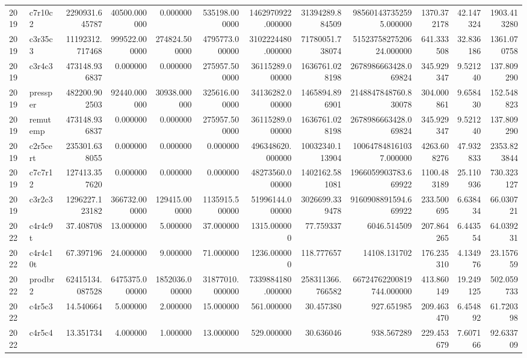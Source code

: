 \begin{tabular}{llrrrrrrrrrr}
2019 & c7r10c2 & 2290931.645787 & 40500.000000 & 0.000000 & 535198.000000 & 1462970922.000000 & 31394289.884509 & 985601437352595.000000 & 1370.372178 & 42.147324 & 1903.413280 \\
2019 & c3r35c3 & 11192312.717468 & 999522.000000 & 274824.500000 & 4795773.000000 & 3102224480.000000 & 71780051.738074 & 5152375827520624.000000 & 641.333508 & 32.836186 & 1361.070758 \\
2019 & c3r4c3 & 473148.936837 & 0.000000 & 0.000000 & 275957.500000 & 36115289.000000 & 1636761.028198 & 2678986663428.069824 & 345.929347 & 9.521240 & 137.809290 \\
2019 & pressper & 482200.902503 & 92440.000000 & 30938.000000 & 325616.000000 & 34136282.000000 & 1465894.896901 & 2148847848760.830078 & 304.000861 & 9.658430 & 152.548823 \\
2019 & remutemp & 473148.936837 & 0.000000 & 0.000000 & 275957.500000 & 36115289.000000 & 1636761.028198 & 2678986663428.069824 & 345.929347 & 9.521240 & 137.809290 \\
2019 & c2r5cert & 235301.638055 & 0.000000 & 0.000000 & 0.000000 & 496348620.000000 & 10032340.113904 & 100647848161037.000000 & 4263.608276 & 47.932833 & 2353.823844 \\
2019 & c7c7r12 & 127413.357620 & 0.000000 & 0.000000 & 0.000000 & 48273560.000000 & 1402162.581081 & 1966059903783.669922 & 1100.483189 & 25.110936 & 730.323127 \\
2019 & c3r2c3 & 1296227.123182 & 366732.000000 & 129415.000000 & 1135915.500000 & 51996144.000000 & 3026699.339478 & 9160908891594.669922 & 233.500695 & 6.638434 & 66.030721 \\
2022 & c4r4c9t & 37.408708 & 13.000000 & 5.000000 & 37.000000 & 1315.000000 & 77.759337 & 6046.514509 & 207.864265 & 6.443554 & 64.039231 \\
2022 & c4r4c10t & 67.397196 & 24.000000 & 9.000000 & 71.000000 & 1236.000000 & 118.777657 & 14108.131702 & 176.235310 & 4.134976 & 23.157659 \\
2022 & prodbr2 & 62415134.087528 & 6475375.000000 & 1852036.000000 & 31877010.000000 & 7339884180.000000 & 258311366.766582 & 66724762200819744.000000 & 413.860149 & 19.249125 & 502.059733 \\
2022 & c4r5c3 & 14.540664 & 5.000000 & 2.000000 & 15.000000 & 561.000000 & 30.457380 & 927.651985 & 209.463470 & 6.454892 & 61.720398 \\
2022 & c4r5c4 & 13.351734 & 4.000000 & 1.000000 & 13.000000 & 529.000000 & 30.636046 & 938.567289 & 229.453679 & 7.607166 & 92.633709 \\

\end{tabular}
